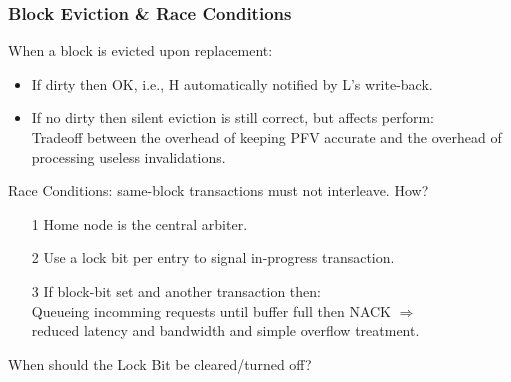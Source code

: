 \documentclass{beamer}
\renewcommand{\emph}[1]{\textcolor{structure}{#1}}
\newcommand{\emp}[1]{\textcolor{DikuRed}{ #1}}
\begin{document}
\begin{frame}[fragile,t]
\frametitle{Block Eviction \& Race Conditions}

\emp{When a block is evicted upon replacement}:
\begin{itemize}
    \item If dirty then OK, i.e., H automatically notified
            by L's write-back.
    \item If no dirty then silent eviction is still correct,
            but affects perform:\\ 
            \emp{Tradeoff} between the overhead of keeping 
            PFV accurate and the overhead of processing 
            useless invalidations.    
\end  {itemize}
\bigskip

Race Conditions: same-block transactions \emp{must not interleave}. \alert{How?}\pause
\begin{itemize}
    \item[1] Home node is the \emph{central arbiter.}
    \item[2] Use a \emph{lock bit per entry} to signal in-progress transaction.
    \item[3] If block-bit set and another transaction then:\\
                \emph{Queueing incomming requests until buffer full then NACK} $\Rightarrow$\\
                reduced latency and bandwidth and simple overflow treatment.
\end  {itemize}
\bigskip

\alert{When should the Lock Bit be cleared/turned off?}
\end{frame}
\end{document}
